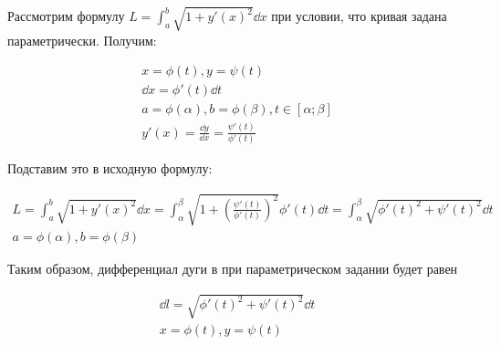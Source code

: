 
Рассмотрим формулу \(L = \int_{a}^{b} \sqrt{1 + y'(x)^2} \dd x\) при условии,
что кривая задана параметрически. Получим:

\begin{align*}
  x = \phi(t), y = \psi(t) \\
  \dd x = \phi'(t) \dd t \\
  a = \phi(\alpha), b = \phi(\beta), t \in [\alpha; \beta] \\
  y'(x) = \frac{\dd y}{\dd x} = \frac{\psi'(t)}{\phi'(t)}
\end{align*}

Подставим это в исходную формулу:

\begin{align*}
  L
  = \int_{a}^{b} \sqrt{1 + y'(x)^2} \dd x
  = \int_{\alpha}^{\beta}
    \sqrt{1 + \left(\frac{\psi'(t)}{\phi'(t)}\right)^2} \phi'(t) \dd t
  = \int_{\alpha}^{\beta} \sqrt{\phi'(t)^2 + \psi'(t)^2} \dd t \\
  a = \phi(\alpha), b = \phi(\beta)
\end{align*}

\begin{remark}\label{arc-diff-param}
  Таким образом, дифференциал дуги в при параметрическом задании будет равен
  
  \begin{align*}
    \dd l = \sqrt{\phi'(t)^2 + \psi'(t)^2} \dd t \\
    x = \phi(t), y = \psi(t) \\
  \end{align*}
\end{remark}